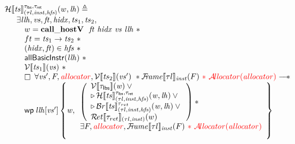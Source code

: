 \documentclass{standalone}
\begin{document}
\flushleft

\[
  \begin{array}{l}
    \Hvalid \llbracket \V{ts} \rrbracket_{(\tau l, \V{inst}, \V{hfs})}^{\tau_{\K{lbs}}, \tau_{\K{ret}}}(w,\V{lh})  \triangleq \\
    \quad \begin{array}{l}
           \exists \V{llh}, \V{vs}, \V{ft}, \V{hidx}, \V{ts}_1, \V{ts}_2,\\
           \quad w = \xxWcallhostV~~\V{ft}~\V{hidx}~\V{vs}~\V{llh} ~\ast \\
           \quad ft = \V{ts}_1 \rightarrow \V{ts}_2 ~\ast \\
           \quad (\V{hidx},\V{ft}) \in \V{hfs} ~\ast \\
           \quad \K{allBasicInstr}(\V{llh}) ~\ast \\
           \quad \Vvalid \llbracket \V{ts}_1 \rrbracket(\V{vs}) ~\ast \\
           \quad \always~\forall \V{vs}', F, \rr{\V{allocator}}, 
           \Vvalid \llbracket \V{ts}_2 \rrbracket(\V{vs}') ~\ast{}
           \FRvalid \llbracket \tau l \rrbracket_{\V{inst}}(F) ~\rr{\ast{}~\Avalid(\V{allocator})}\wand\\
           \quad \wpre{\V{llh}[\V{vs}']}
	         {\V{w},
                   \begin{array}{l}
                     \left(
          \begin{array}{l}
          \Vvalid \llbracket \tau_{\K{lbs}} \rrbracket(\V{w}) \vee {} \\
          \later \Hvalid \llbracket \V{ts} \rrbracket_{(\tau l, \V{inst}, \V{hfs})}^{\tau_{\K{lbs}}, \tau_{\K{ret}}}(\V{w}, \V{lh}) \vee {} \\
	  \later \BRvalid \llbracket \V{ts} \rrbracket_{(\tau l, \V{inst},\V{hfs})}^{\tau_{ret}}{ \left( \V{w},\V{lh} \right) } \vee {}
	  \\
	  \Rvalid \llbracket \tau_{ret} \rrbracket_{(\tau l, \V{inst})}(w)
	  \end{array}
	  \right) \ast {}
	\\
	\exists F, \rr{\V{allocator}}, \FRvalid\llbracket \tau l \rrbracket_{\V{inst}}(F)\rr{~\ast{}~ \Avalid(\V{allocator})}\\[1em]
        \end{array}}
         \end{array}
  \end{array}
\]
\end{document}
